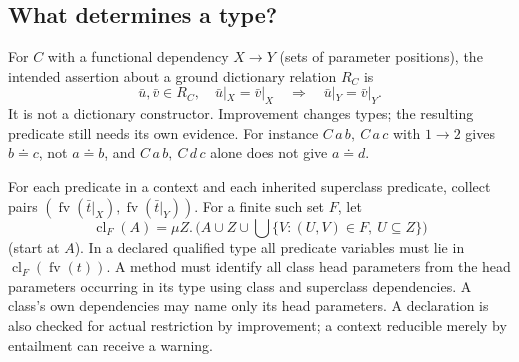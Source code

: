 \documentclass[11pt]{article}
\theoremstyle{definition}
\newcommand{\fv}{\operatorname{fv}}
\newcommand{\clo}{\operatorname{cl}}
\newcommand{\eqs}{\doteq}
\begin{document}
\subsection{What determines a type?}\label{sec:fd}
For $C$ with a functional dependency $X\to Y$ (sets of parameter positions),
the intended assertion about a ground dictionary relation $R_C$ is
\[
 \bar u,\bar v\in R_C,\quad \bar u|_X=\bar v|_X
       \quad\Longrightarrow\quad \bar u|_Y=\bar v|_Y.       \tag{FD}
\]
It is not a dictionary constructor. Improvement changes types; the
resulting predicate still needs its own evidence. For instance
$C\,a\,b,\ C\,a\,c$ with $1\to2$ gives $b\eqs c$, not $a\eqs b$,
and $C\,a\,b,\ C\,d\,c$ alone does not give $a\eqs d$.

For each predicate in a context and each inherited superclass predicate,
collect pairs
$(\fv(\bar t|_X),\fv(\bar t|_Y))$. For a finite such set $F$, let
\[
 \clo_F(A)=\mu Z.\,\bigl(A\cup Z\cup
                  \bigcup\{V:(U,V)\in F,\ U\subseteq Z\}\bigr)
\]
(start at $A$). In a declared qualified type all predicate variables must
lie in $\clo_F(\fv(t))$. A method must identify all class head parameters
from the head parameters occurring in its type using class and superclass
dependencies. A class's own dependencies may name only its head parameters.
A declaration is also checked for actual restriction by improvement; a
context reducible merely by entailment can receive a warning.
\end{document}
